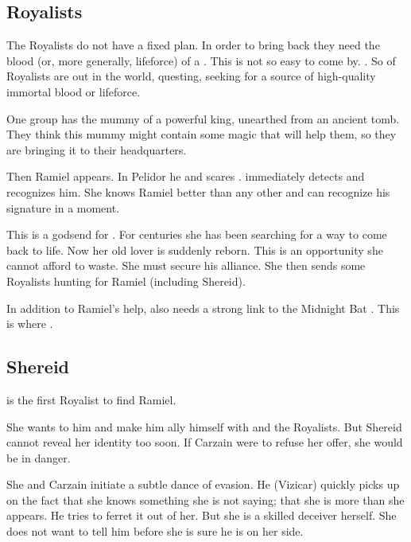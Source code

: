 \begin{garbage}
\subsection{Royalists}
The Royalists do not have a fixed plan. 
In order to bring \Belzir{} back they need the blood (or, more generally, lifeforce) of a \resphan. 
This is not so easy to come by. 
\Shiaraid{} . 
So  of Royalists are out in the world, questing, seeking for a source of high-quality immortal blood or lifeforce. 

One group has the mummy of a powerful \quiljaaran{} king, unearthed from an ancient tomb. 
They think this mummy might contain some magic that will help them, so they are bringing it to their headquarters. 

Then Ramiel appears.
In Pelidor he  and scares \Nzessuacrith. 
\Shiaraid{} immediately detects and recognizes him. 
She knows Ramiel better than any other and can recognize his \vertex{} signature in a moment. 

This is a godsend for \Shiaraid. 
For centuries she has been searching for a way to come back to life. 
Now her old lover is suddenly reborn. 
This is an opportunity she cannot afford to waste. 
She must secure his alliance. 
She then sends some Royalists hunting for Ramiel (including Shereid). 

In addition to Ramiel's help, \Shiaraid{} also needs a strong link to the Midnight Bat \matrix. 
This is where . 





\subsection{Shereid}
 is the first Royalist to find Ramiel. 

She wants to  him and make him ally himself with \Belzir{} and the Royalists.
But Shereid cannot reveal her identity too soon. 
If Carzain were to refuse her offer, she would be in danger. 

She and Carzain initiate a subtle dance of evasion. 
He (Vizicar) quickly picks up on the fact that she knows something she is not saying; that she is more than she appears. 
He tries to ferret it out of her. 
But she is a skilled deceiver herself. 
She does not want to tell him before she is sure he is on her side. 


\end{garbage}
